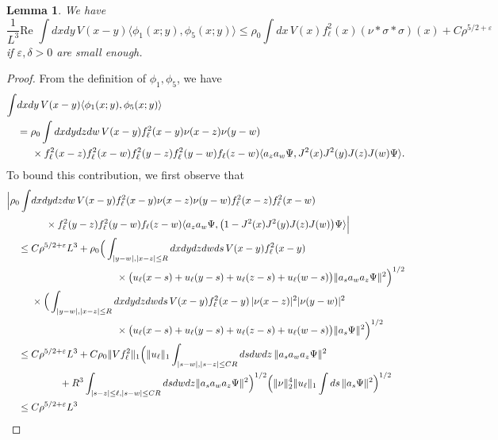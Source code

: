 \documentclass[a4paper,11pt]{article}
\def\eps{\varepsilon}
\newtheorem{lemma}[theorem]{Lemma}
\numberwithin{equation}{section}
\begin{document}
\begin{lemma} \label{lm:phi1phi5} 
We have 
\[ \frac{1}{L^3} \text{Re } \int dx dy \, V(x-y) \langle \phi_1 (x;y) , \phi_5 (x;y) \rangle \leq \rho_0 \int dx \, V(x) f_\ell^2 (x) (\nu * \sigma * \sigma) (x) +C \rho^{5/2+\eps} \]
if $\eps, \delta > 0$ are small enough. 
\end{lemma} 
\begin{proof} 
From the definition of $\phi_1, \phi_5$, we have 
\[ \begin{split} 
 \int &dx dy \, V(x-y) \langle \phi_1 (x;y) , \phi_5 (x;y) \rangle \\ &= \rho_0 \int dx dy dz dw \, V(x-y) f_\ell^2 (x-y) \nu (x-z) \nu (y-w) \\ &\hspace{.5cm} \times  f_\ell^2 (x-z) f_\ell^2 (x-w) f_\ell^2 (y-z) f_\ell^2 (y-w) f_\ell(z-w) \langle a_z a_w \Psi, J^2 (x) J^2 (y) J(z) J(w) \Psi \rangle .\end{split} \]
 To bound this contribution, we first observe that 
 \[ \begin{split} 
 \Big| \rho_0 \int &dx dy dz dw \, V(x-y) f_\ell^2 (x-y) \nu (x-z) \nu (y-w)  f_\ell^2 (x-z) f_\ell^2 (x-w)  \\ &\hspace{.5cm} \times f_\ell^2 (y-z) f_\ell^2 (y-w) f_\ell(z-w) \langle a_z a_w \Psi, \big(1 - J^2 (x) J^2 (y) J(z) J(w) \big) \Psi \rangle \Big| \\
 \leq \; &C \rho^{5/2+\eps} L^3 + \rho_0 \Big( \int_{|y-w| , |x-z| \leq R} dx dy dz dw ds \, V(x-y)f_\ell^2(x-y) \, \\ &\hspace{3cm} \times \big(u_\ell (x-s) + u_\ell (y-s) + u_\ell (z-s) + u_\ell (w-s) \big) \| a_s a_w a_z \Psi \|^2 \Big)^{1/2} \\ &\times \Big(   \int_{|y-w| , |x-z| \leq R} dx dy dz dw ds \, V(x-y) f_\ell^2(x-y)\, |\nu (x-z)|^2 |\nu (y-w)|^2 \\ &\hspace{3cm} \times \big(u_\ell (x-s) + u_\ell (y-s) + u_\ell (z-s) + u_\ell (w-s) \big) \| a_s \Psi \|^2 \Big)^{1/2}  \\ \leq \; &C \rho^{5/2+\eps} L^3 + C \rho_0 \|Vf_\ell^2\|_1 \Big( \| u_\ell \|_1 \int_{|s-w|, |s-z| \leq C R}  ds dw dz \, \| a_s a_w a_z \Psi \|^2 \\ &\hspace{1cm} + R^3 \int_{|s-z| \leq \ell, |s-w| \leq CR} ds dw dz \| a_s a_w a_z \Psi \|^2 \Big)^{1/2} \Big( \| \nu \|_2^4 \| u_\ell \|_1 \int ds \, \| a_s \Psi \|^2 \Big)^{1/2} \\ \leq \; &C \rho^{5/2+\eps} L^3  

\end{split}\]
\end{proof}
\end{document}
